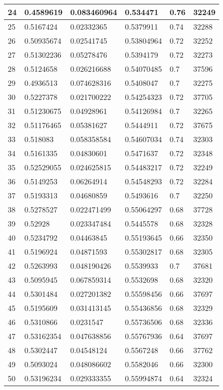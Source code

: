\begin{longtable}{|l|l|l|l|l|l|}
24 & 0.4589619 & 0.083460964 & 0.534471 & 0.76 & 32249 \\ \hline 
25 & 0.5167424 & 0.02332365 & 0.5379911 & 0.74 & 32288 \\ \hline 
26 & 0.50935674 & 0.02541745 & 0.53804964 & 0.72 & 32252 \\ \hline 
27 & 0.51302236 & 0.05278476 & 0.5394179 & 0.72 & 32273 \\ \hline 
28 & 0.5124658 & 0.026216688 & 0.54070485 & 0.7 & 37596 \\ \hline 
29 & 0.4936513 & 0.074628316 & 0.5408047 & 0.7 & 32275 \\ \hline 
30 & 0.5227378 & 0.021700222 & 0.54254323 & 0.72 & 37705 \\ \hline 
31 & 0.51230675 & 0.04928961 & 0.54126984 & 0.7 & 32265 \\ \hline 
32 & 0.51176465 & 0.05381627 & 0.5444911 & 0.72 & 37675 \\ \hline 
33 & 0.518083 & 0.058358584 & 0.54607034 & 0.74 & 32303 \\ \hline 
34 & 0.5161335 & 0.04830601 & 0.5471637 & 0.72 & 32348 \\ \hline 
35 & 0.52529055 & 0.024625815 & 0.54483217 & 0.72 & 32249 \\ \hline 
36 & 0.5149253 & 0.06264914 & 0.54548293 & 0.72 & 32284 \\ \hline 
37 & 0.5193313 & 0.04680859 & 0.5493616 & 0.7 & 32250 \\ \hline 
38 & 0.5278527 & 0.022471499 & 0.55064297 & 0.68 & 37728 \\ \hline 
39 & 0.52928 & 0.023347484 & 0.5445578 & 0.68 & 32328 \\ \hline 
40 & 0.5234792 & 0.04463845 & 0.55193645 & 0.66 & 32350 \\ \hline 
41 & 0.5196924 & 0.04871593 & 0.55302817 & 0.68 & 32305 \\ \hline 
42 & 0.5263993 & 0.048190426 & 0.5539933 & 0.7 & 37681 \\ \hline 
43 & 0.5095945 & 0.067859314 & 0.5532698 & 0.68 & 32320 \\ \hline 
44 & 0.5301484 & 0.027201382 & 0.55598456 & 0.66 & 37697 \\ \hline 
45 & 0.5195609 & 0.031413145 & 0.55436856 & 0.68 & 32329 \\ \hline 
46 & 0.5310866 & 0.0231547 & 0.55736506 & 0.68 & 32336 \\ \hline 
47 & 0.53162354 & 0.047638856 & 0.55767936 & 0.64 & 37697 \\ \hline 
48 & 0.5302447 & 0.04548124 & 0.5567248 & 0.66 & 37762 \\ \hline 
49 & 0.5093024 & 0.048086602 & 0.5582046 & 0.66 & 32300 \\ \hline 
50 & 0.53196234 & 0.029333355 & 0.55994874 & 0.64 & 32324 \\ \hline 
\end{longtable}